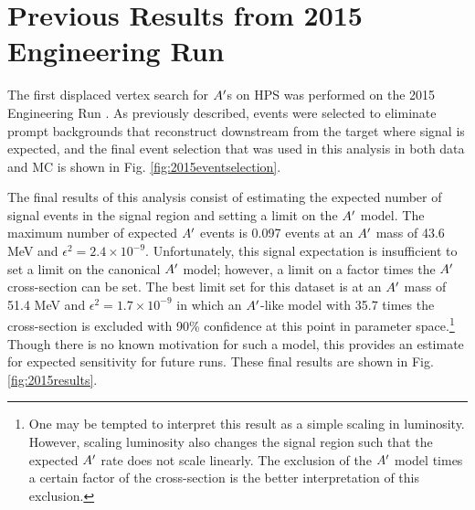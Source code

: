 

\section{Previous Results from 2015 Engineering Run}\label{sec:2015vertexing}

The first displaced vertex search for $A^\prime$s on HPS was performed on the 2015 Engineering Run \cite{adrian2018search}. As previously described, events were selected to eliminate prompt backgrounds that reconstruct downstream from the target where signal is expected, and the final event selection that was used in this analysis in both data and MC is shown in Fig. \ref{fig:2015eventselection}.

The final results of this analysis consist of estimating the expected number of signal events in the signal region and setting a limit on the $A^\prime$ model. The maximum number of expected $A^\prime$ events is 0.097 events at an $A^\prime$ mass of 43.6 MeV and $\epsilon^2 = 2.4 \times 10^{-9}$. Unfortunately, this signal expectation is insufficient to set a limit on the canonical $A^\prime$ model; however, a limit on a factor times the $A^\prime$ cross-section can be set. The best limit set for this dataset is at an $A^\prime$ mass of 51.4 MeV and $\epsilon^2=1.7 \times 10^{-9}$ in which an $A^\prime$-like model with 35.7 times the cross-section is excluded with 90\% confidence at this point in parameter space.\footnote{One may be tempted to interpret this result as a simple scaling in luminosity. However, scaling luminosity also changes the signal region such that the expected $A^\prime$ rate does not scale linearly. The exclusion of the $A^\prime$ model times a certain factor of the cross-section is the better interpretation of this exclusion.} Though there is no known motivation for such a model, this provides an estimate for expected sensitivity for future runs. These final results are shown in Fig. \ref{fig:2015results}.

